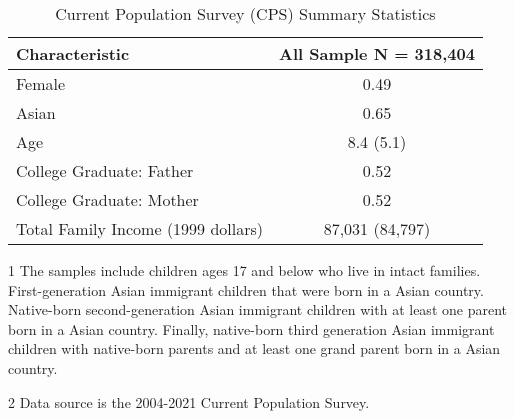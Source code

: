 \begin{table}

\caption{Current Population Survey (CPS) Summary Statistics \label{tab:sumstat1}}
\centering
\begin{threeparttable}
\begin{tabular}[t]{lc}
\toprule
Characteristic & All Sample N = 318,404\\
\midrule
Female & 0.49\\
Asian & 0.65\\
Age & 8.4 (5.1)\\
College Graduate:  	 Father & 0.52\\
College Graduate:  	 Mother & 0.52\\
Total Family Income  	 (1999 dollars) & 87,031 (84,797)\\
\bottomrule
\end{tabular}
\begin{tablenotes}
\item[1] The samples include children ages 17 and below who live in intact families. First-generation Asian immigrant children that were born in a Asian country. Native-born second-generation Asian immigrant children with at least one parent born in a Asian country. Finally, native-born third generation Asian immigrant children with native-born parents and at least one grand parent born in a Asian country.
\item[2] Data source is the 2004-2021 Current Population Survey.
\end{tablenotes}
\end{threeparttable}
\end{table}

